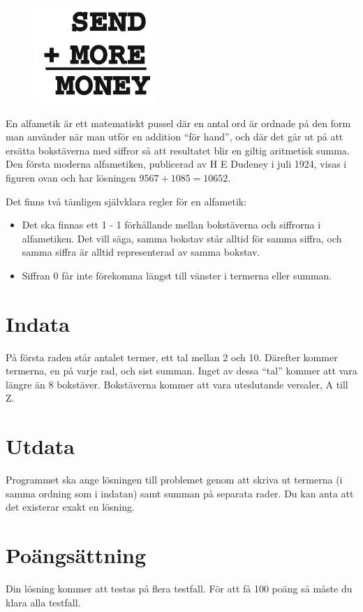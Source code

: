 
\begin{figure}
   \centering
	\includegraphics{alfametik}
\end{figure}

En alfametik är ett matematiskt pussel där en antal ord är ordnade på den form man använder när man utför en addition ``för hand'', och där det går ut på att ersätta bokstäverna med siffror så att resultatet blir en giltig aritmetisk summa. Den första moderna alfametiken, publicerad av H E Dudeney i juli 1924, visas i figuren ovan och har lösningen $9567 + 1085 = 10652$.

Det finns två tämligen självklara regler för en alfametik: 

\begin{itemize}

\item Det ska finnas ett 1 - 1 förhållande mellan bokstäverna och siffrorna i alfametiken. Det vill säga, samma bokstav står alltid för samma siffra, och samma siffra är alltid representerad av samma bokstav.

\item Siffran 0 får inte förekomma längst till vänster i termerna eller summan.

\end{itemize}

\section*{Indata}
På första raden står antalet termer, ett tal mellan 2 och 10. Därefter kommer termerna, en på varje rad, och sist summan. Inget av dessa ``tal'' kommer att vara längre än 8 bokstäver. Bokstäverna kommer att vara uteslutande versaler, A till Z. 

\section*{Utdata}
Programmet ska ange lösningen till problemet genom att skriva ut termerna (i samma ordning som i indatan) samt summan på separata rader. Du kan anta att det existerar exakt en lösning. 


\section*{Poängsättning}
Din lösning kommer att testas på flera testfall. För att få 100 poäng så måste du klara alla testfall.

